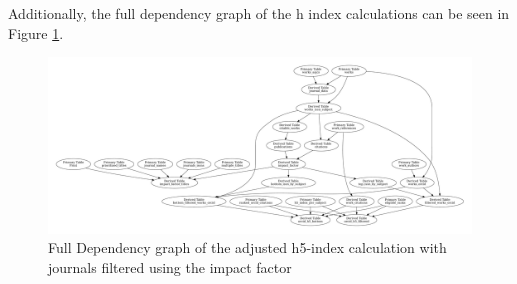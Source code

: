 Additionally, the full dependency graph of the h index calculations can be seen
in Figure \ref{fig:dependency_graph_jif}.

\begin{figure}[H]
    \centering
    \includegraphics[width=\textwidth]{../figs/full-graph_jif.pdf}
    \caption{Full Dependency graph of the adjusted h5-index calculation with journals filtered using the impact factor}
    \label{fig:dependency_graph_jif}
\end{figure}